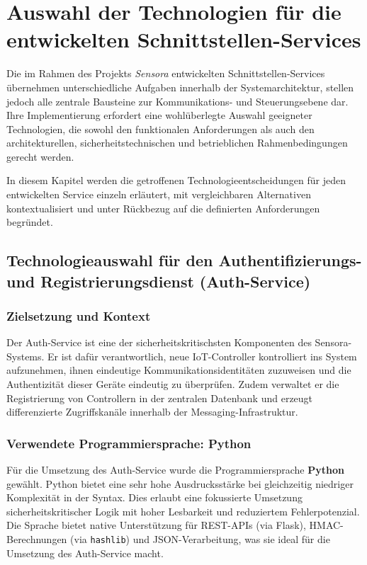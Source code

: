 \section{Auswahl der Technologien f\"ur die entwickelten Schnittstellen-Services}

Die im Rahmen des Projekts \textit{Sensora} entwickelten Schnittstellen-Services \"ubernehmen unterschiedliche Aufgaben innerhalb der Systemarchitektur, stellen jedoch alle zentrale Bausteine zur Kommunikations- und Steuerungsebene dar. Ihre Implementierung erfordert eine wohl\"uberlegte Auswahl geeigneter Technologien, die sowohl den funktionalen Anforderungen als auch den architekturellen, sicherheitstechnischen und betrieblichen Rahmenbedingungen gerecht werden.

In diesem Kapitel werden die getroffenen Technologieentscheidungen f\"ur jeden entwickelten Service einzeln erl\"autert, mit vergleichbaren Alternativen kontextualisiert und unter R\"uckbezug auf die definierten Anforderungen begr\"undet.

\subsection{Technologieauswahl f\"ur den Authentifizierungs- und Registrierungsdienst (Auth-Service)}

\subsubsection*{Zielsetzung und Kontext}

Der Auth-Service ist eine der sicherheitskritischsten Komponenten des Sensora-Systems. Er ist daf\"ur verantwortlich, neue IoT-Controller kontrolliert ins System aufzunehmen, ihnen eindeutige Kommunikationsidentit\"aten zuzuweisen und die Authentizit\"at dieser Ger\"ate eindeutig zu \"uberpr\"ufen. Zudem verwaltet er die Registrierung von Controllern in der zentralen Datenbank und erzeugt differenzierte Zugriffskan\"ale innerhalb der Messaging-Infrastruktur.

\subsubsection*{Verwendete Programmiersprache: Python}

F\"ur die Umsetzung des Auth-Service wurde die Programmiersprache \textbf{Python} gew\"ahlt. Python bietet eine sehr hohe Ausdrucksst\"arke bei gleichzeitig niedriger Komplexit\"at in der Syntax\cite{python_flask_prototyping}. Dies erlaubt eine fokussierte Umsetzung sicherheitskritischer Logik mit hoher Lesbarkeit und reduziertem Fehlerpotenzial. Die Sprache bietet native Unterst\"utzung f\"ur REST-APIs (via Flask), HMAC-Berechnungen (via \texttt{hashlib}) und JSON-Verarbeitung, was sie ideal f\"ur die Umsetzung des Auth-Service macht.

